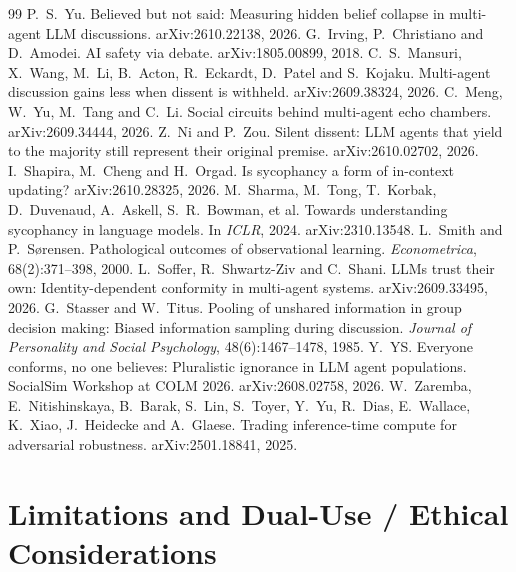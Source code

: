 \documentclass[11pt]{article}
\begin{document}
\begin{thebibliography}{99}
  P.~S.~Yu. Believed but not said: Measuring hidden belief collapse in multi-agent LLM discussions.
  arXiv:2610.22138, 2026.
 G.~Irving, P.~Christiano and D.~Amodei. AI safety via
  debate. arXiv:1805.00899, 2018.
 C.~S.~Mansuri, X.~Wang, M.~Li, B.~Acton, R.~Eckardt,
  D.~Patel and S.~Kojaku. Multi-agent discussion gains less when dissent is withheld. arXiv:2609.38324, 2026.
 C.~Meng, W.~Yu, M.~Tang and C.~Li. Social circuits behind
  multi-agent echo chambers. arXiv:2609.34444, 2026.
 Z.~Ni and P.~Zou. Silent dissent: LLM agents that yield to
  the majority still represent their original premise. arXiv:2610.02702, 2026.
 I.~Shapira, M.~Cheng and H.~Orgad. Is sycophancy a
  form of in-context updating? arXiv:2610.28325, 2026.
 M.~Sharma, M.~Tong, T.~Korbak, D.~Duvenaud, A.~Askell,
  S.~R.~Bowman, et al. Towards understanding sycophancy in language models. In \emph{ICLR}, 2024.
  arXiv:2310.13548.
 L.~Smith and P.~S{\o}rensen. Pathological
  outcomes of observational learning. \emph{Econometrica}, 68(2):371--398, 2000.
 L.~Soffer, R.~Shwartz-Ziv and C.~Shani. LLMs trust their
  own: Identity-dependent conformity in multi-agent systems. arXiv:2609.33495, 2026.
 G.~Stasser and W.~Titus. Pooling of unshared
  information in group decision making: Biased information sampling during discussion. \emph{Journal of
  Personality and Social Psychology}, 48(6):1467--1478, 1985.
 Y.~YS. Everyone conforms, no one believes: Pluralistic ignorance in
  LLM agent populations. SocialSim Workshop at COLM 2026. arXiv:2608.02758, 2026.
 W.~Zaremba, E.~Nitishinskaya, B.~Barak, S.~Lin,
  S.~Toyer, Y.~Yu, R.~Dias, E.~Wallace, K.~Xiao, J.~Heidecke and A.~Glaese. Trading inference-time compute
  for adversarial robustness. arXiv:2501.18841, 2025.
\end{thebibliography}

\appendix

\section{Limitations and Dual-Use / Ethical Considerations}
\label{app:ethics}
\end{document}
